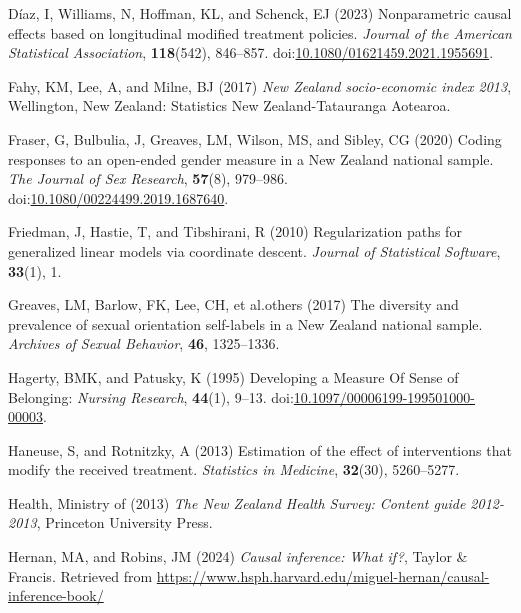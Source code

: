 \documentclass[
  single column]{article}
\newlength{\cslhangindent}
\newenvironment{CSLReferences}[2] %
 {\begin{list}{}{%
  \setlength{\itemindent}{0pt}
  \setlength{\leftmargin}{0pt}
  \setlength{\parsep}{0pt}
  \ifodd #1
   \setlength{\leftmargin}{\cslhangindent}
   \setlength{\itemindent}{-1\cslhangindent}
  \fi
  \setlength{\itemsep}{#2\baselineskip}}}
 {\end{list}}
\begin{document}
\begin{CSLReferences}{1}{0}
Díaz, I, Williams, N, Hoffman, KL, and Schenck, EJ (2023) Nonparametric
causal effects based on longitudinal modified treatment policies.
\emph{Journal of the American Statistical Association},
\textbf{118}(542), 846--857.
doi:\href{https://doi.org/10.1080/01621459.2021.1955691}{10.1080/01621459.2021.1955691}.

Fahy, KM, Lee, A, and Milne, BJ (2017) \emph{{N}ew {Z}ealand
socio-economic index 2013}, Wellington, New Zealand: Statistics New
Zealand-Tatauranga Aotearoa.

Fraser, G, Bulbulia, J, Greaves, LM, Wilson, MS, and Sibley, CG (2020)
Coding responses to an open-ended gender measure in a {N}ew {Z}ealand
national sample. \emph{The Journal of Sex Research}, \textbf{57}(8),
979--986.
doi:\href{https://doi.org/10.1080/00224499.2019.1687640}{10.1080/00224499.2019.1687640}.

Friedman, J, Hastie, T, and Tibshirani, R (2010) Regularization paths
for generalized linear models via coordinate descent. \emph{Journal of
Statistical Software}, \textbf{33}(1), 1.

Greaves, LM, Barlow, FK, Lee, CH, et al.others (2017) The diversity and
prevalence of sexual orientation self-labels in a {N}ew {Z}ealand
national sample. \emph{Archives of Sexual Behavior}, \textbf{46},
1325--1336.

Hagerty, BMK, and Patusky, K (1995) Developing a Measure Of Sense of
Belonging: \emph{Nursing Research}, \textbf{44}(1), 9--13.
doi:\href{https://doi.org/10.1097/00006199-199501000-00003}{10.1097/00006199-199501000-00003}.

Haneuse, S, and Rotnitzky, A (2013) Estimation of the effect of
interventions that modify the received treatment. \emph{Statistics in
Medicine}, \textbf{32}(30), 5260--5277.

Health, Ministry of (2013) \emph{The {N}ew {Z}ealand {H}ealth {S}urvey:
Content guide 2012-2013}, Princeton University Press.

Hernan, MA, and Robins, JM (2024) \emph{Causal inference: What if?},
Taylor \& Francis. Retrieved from
\url{https://www.hsph.harvard.edu/miguel-hernan/causal-inference-book/}


\end{CSLReferences}
\end{document}
